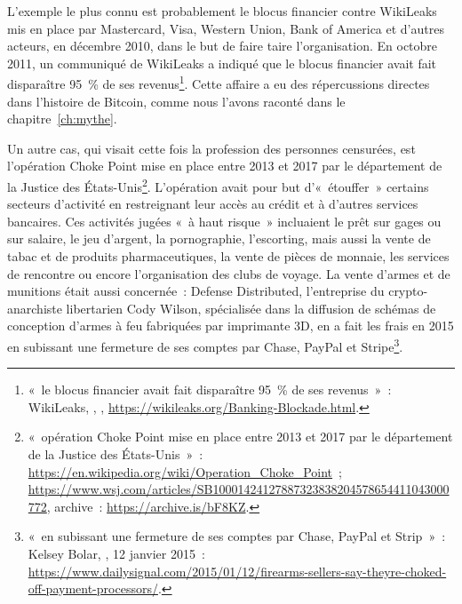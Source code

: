 
L'exemple le plus connu est probablement le blocus financier contre WikiLeaks mis en place par Mastercard, Visa, Western Union, Bank of America et d'autres acteurs, en décembre 2010, dans le but de faire taire l'organisation. En octobre 2011, un communiqué de WikiLeaks a indiqué que le blocus financier avait fait disparaître 95~\% de ses revenus\footnote{«~le blocus financier avait fait disparaître 95~\% de ses revenus~»~: WikiLeaks, , , \url{https://wikileaks.org/Banking-Blockade.html}.}. Cette affaire a eu des répercussions directes dans l'histoire de Bitcoin, comme nous l'avons raconté dans le chapitre~\ref{ch:mythe}.

Un autre cas, qui visait cette fois la profession des personnes censurées, est l'opération Choke Point mise en place entre 2013 et 2017 par le département de la Justice des États-Unis\footnote{«~opération Choke Point mise en place entre 2013 et 2017 par le département de la Justice des États-Unis~»~: \url{https://en.wikipedia.org/wiki/Operation_Choke_Point}~; \url{https://www.wsj.com/articles/SB10001424127887323838204578654411043000772}, archive~: \url{https://archive.is/bF8KZ}.}. L'opération avait pour but d'«~étouffer~» certains secteurs d'activité en restreignant leur accès au crédit et à d'autres services bancaires. Ces activités jugées «~à haut risque~» incluaient le prêt sur gages ou sur salaire, le jeu d'argent, la pornographie, l'escorting, mais aussi la vente de tabac et de produits pharmaceutiques, la vente de pièces de monnaie, les services de rencontre ou encore l'organisation des clubs de voyage. La vente d'armes et de munitions était aussi concernée~: Defense Distributed, l'entreprise du crypto-anarchiste libertarien Cody Wilson, spécialisée dans la diffusion de schémas de conception d'armes à feu fabriquées par imprimante 3D, en a fait les frais en 2015 en subissant une fermeture de ses comptes par Chase, PayPal et Stripe\footnote{«~en subissant une fermeture de ses comptes par Chase, PayPal et Strip~»~: Kelsey Bolar, , 12 janvier 2015~: \url{https://www.dailysignal.com/2015/01/12/firearms-sellers-say-theyre-choked-off-payment-processors/}.}.

